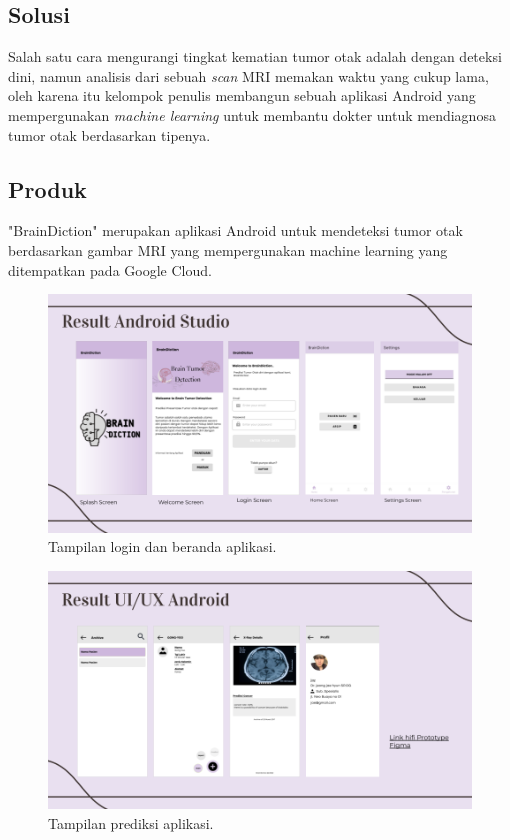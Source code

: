 \subsection{Solusi}
Salah satu cara mengurangi tingkat kematian tumor otak adalah dengan deteksi dini, namun analisis dari sebuah \textit{scan} MRI memakan waktu yang cukup lama, oleh karena itu kelompok penulis membangun sebuah aplikasi Android yang mempergunakan \textit{machine learning} untuk membantu dokter untuk mendiagnosa tumor otak berdasarkan tipenya.
\subsection{Produk}
"BrainDiction" merupakan aplikasi Android untuk mendeteksi tumor otak berdasarkan gambar MRI yang mempergunakan machine learning yang ditempatkan pada Google Cloud.
\begin{figure}[H]
	\centering
	\includegraphics[scale=0.35]{./assets/loginhome}
	\caption{Tampilan login dan beranda aplikasi.}
\end{figure}
\begin{figure}[H]
	\centering
	\includegraphics[scale=0.35]{./assets/predictionscreen}
	\caption{Tampilan prediksi aplikasi.}
\end{figure}
